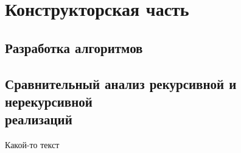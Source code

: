 \chapter{Конструкторская часть}
\label{cha:design}

\section{Разработка алгоритмов}

\section{Сравнительный анализ рекурсивной и нерекурсивной\\ реализаций}

Какой-то текст
